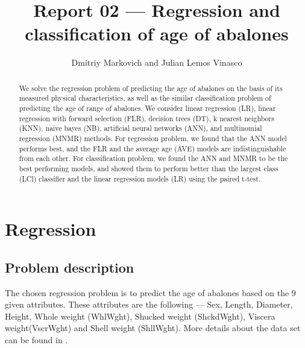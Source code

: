 \documentclass[10pt, paper=a4]{article}
\begin{document}
\title{Report 02 --- Regression and classification of age of abalones}

\author{Dmitriy Markovich and Julian Lemos Vinasco}

\date{}

\maketitle

\begin{abstract}
  We solve the regression problem of predicting the age of abalones on
  the basis of its measured physical characteristics, as well as the
  similar classification problem of predicting the age of range of
  abalones.  We consider linear regression (LR), linear regression
  with forward selection (FLR), decision trees (DT), k nearest
  neighbors (KNN), naive bayes (NB), artificial neural networks (ANN),
  and multinomial regression (MNMR) methods.  For regression problem,
  we found that the ANN model performs best, and the FLR and the
  average age (AVE) models are indistinguishable from each other.  For
  classification problem, we found the ANN and MNMR to be the best
  performing models, and showed them to perform better than the
  largest class (LCl) classifier and the linear regression models (LR)
  using the paired t-test.
\end{abstract}

\section{Regression}
\label{sec:regression}

\subsection{Problem description}
The chosen regression problem is to predict the age of abalones based
on the 9 given attributes.  These attributes are the following ---
Sex, Length, Diameter, Height, Whole weight (WhlWght), Shucked weight
(ShckdWght), Viscera weight(VscrWght) and Shell weight (ShllWght).
More details about the data set can be found in
\cite{datadescription}.
\end{document}
